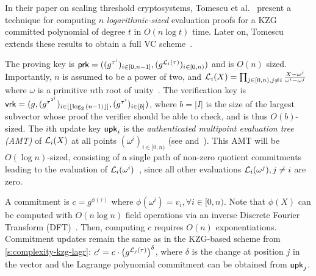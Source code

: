 In their paper on scaling threshold cryptosystems, Tomescu et al.~\cite{TCZ+20} present a technique for computing $n$ \textit{logarithmic-sized} evaluation proofs for a KZG committed polynomial of degree $t$ in $O(n\log{t})$ time.
Later on, Tomescu extends these results to obtain a full VC scheme~\cite[Sec  9.2]{Tomescu20}.

The proving key is $\mathsf{prk}=((g^{\tau^i})_{i\in [0,n-1]},(g^{\mathcal{L}_i(\tau)})_{i\in [0,n)})$ and is $O(n)$ sized.
Importantly, $n$ is assumed to be a power of two, and $\mathcal{L}_i(X)=\prod_{j\in [0,n),j\ne i} \frac{X-\omega^j}{\omega^i - \omega^j}$ where $\omega$ is a primitive $n$th root of unity~\cite{vG13ModernCh8}.
The verification key is $\mathsf{vrk}=(g,(g^{\tau^{2^i}})_{i\in [\lfloor\log_2{(n-1)}\rfloor]}, (g^{\tau^i})_{i\in[b]})$, where $b=|I|$ is the size of the largest subvector whose proof the verifier should be able to check, and is thus $O(b)$-sized.
The $i$th update key $\mathsf{upk}_i$ is the \textit{authenticated multipoint evaluation tree (AMT)} of $\mathcal{L}_i(X)$ at all points $(\omega^i)_{i\in [0,n)}$ (see \cite[Sec III-B]{TCZ+20} and~\cite[Ch 9]{Tomescu20}).
This AMT will be $O(\log{n})$-sized, consisting of a single path of non-zero quotient commitments leading to the evaluation of $\mathcal{L}_i(\omega^i)$~\cite[Sec 9.2.2]{Tomescu20}, since all other evaluations $\mathcal{L}_i(\omega^j), j\ne i$ are zero.

A commitment is $c=g^{\phi(\tau)}$ where $\phi(\omega^i)=v_i,\forall i\in[0,n)$.
Note that $\phi(X)$ can be computed with $O(n\log{n})$ field operations via an inverse Discrete Fourier Transform (DFT)~\cite[Ch 30.2]{CLRS09}.
Then, computing $c$ requires $O(n)$ exponentiations.
Commitment updates remain the same as in the KZG-based scheme from \cref{s:complexity-kzg-lagr}: $c' = c\cdot \left(g^{\mathcal{L}_j(\tau)}\right)^{\delta}$, where $\delta$ is the change at position $j$ in the vector and the Lagrange polynomial commitment can be obtained from $\mathsf{upk}_j$.

